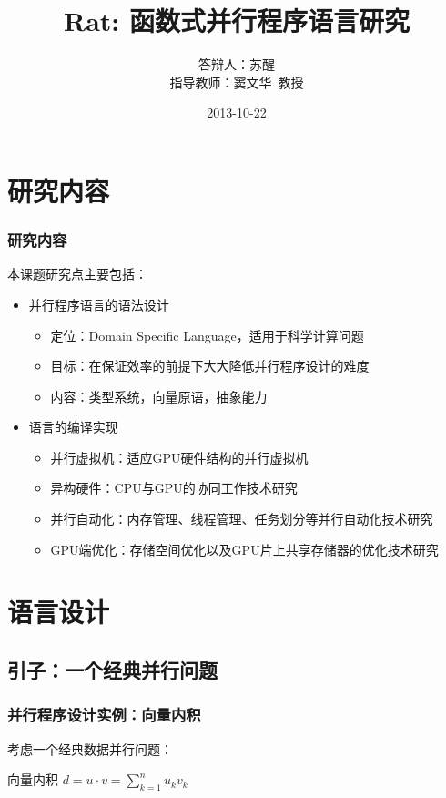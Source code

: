 \documentclass{beamer}
\title{Rat: 函数式并行程序语言研究}
\author[苏醒~pysuxing@gmail.com]{
\begin{tabular}{ll}
答辩人： & 苏醒 \\
指导教师： & 窦文华~教授
\end{tabular}
}
\institute{计算机所641教研室}
\date{2013-10-22}
\begin{document}
\setlength{\parindent}{0pt}
\begin{frame}
  \titlepage
\end{frame}

\begin{frame}
  \tableofcontents
\end{frame}

\section{研究内容}
\frame{\tableofcontents[currentsection]}
\begin{frame}
  \frametitle{研究内容}
  本课题研究点主要包括：
  \begin{itemize}
    \item 并行程序语言的语法设计
      \begin{itemize}
        \item 定位：Domain Specific Language，适用于科学计算问题
        \item 目标：在保证效率的前提下大大降低并行程序设计的难度
        \item 内容：类型系统，向量原语，抽象能力
      \end{itemize}
      \pause
    \item 语言的编译实现
      \begin{itemize}
        \item 并行虚拟机：适应GPU硬件结构的并行虚拟机
        \item 异构硬件：CPU与GPU的协同工作技术研究
        \item 并行自动化：内存管理、线程管理、任务划分等并行自动化技术研究
        \item GPU端优化：存储空间优化以及GPU片上共享存储器的优化技术研究
      \end{itemize}
  \end{itemize}
\end{frame}

\section{语言设计}
\frame{\tableofcontents[currentsection]}
\subsection{引子：一个经典并行问题}
\begin{frame}[t]
  \frametitle{并行程序设计实例：向量内积}
  考虑一个经典数据并行问题：
  \begin{block}{向量内积}
    $d=u \cdot v = \sum_{k=1}^nu_kv_k$
  \end{block}

\end{frame}
\end{document}
